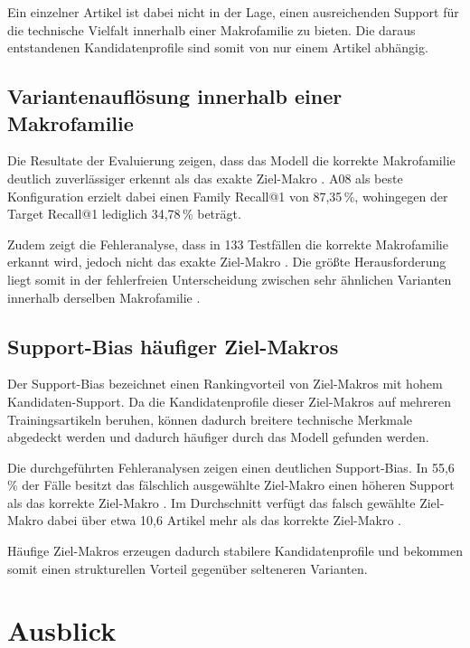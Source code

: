 Ein einzelner Artikel ist dabei nicht in der Lage, einen ausreichenden Support für die technische Vielfalt innerhalb einer Makrofamilie zu bieten.
Die daraus entstandenen Kandidatenprofile sind somit von nur einem Artikel abhängig.

\subsection{Variantenauflösung innerhalb einer Makrofamilie}

Die Resultate der Evaluierung zeigen, dass das Modell die korrekte Makrofamilie deutlich zuverlässiger erkennt als das exakte Ziel-Makro \parencite{EPLAN-Makros}.
A08 als beste Konfiguration erzielt dabei einen Family Recall@1 von 87,35\,\%, wohingegen der Target Recall@1 lediglich 34,78\,\% beträgt.

Zudem zeigt die Fehleranalyse, dass in 133 Testfällen die korrekte Makrofamilie erkannt wird, jedoch nicht das exakte Ziel-Makro \parencite{EPLAN-Makros}.
Die größte Herausforderung liegt somit in der fehlerfreien Unterscheidung zwischen sehr ähnlichen Varianten innerhalb derselben Makrofamilie \parencite{LTR_Configuration_Test_Series}.

\subsection{Support-Bias häufiger Ziel-Makros}

Der Support-Bias bezeichnet einen Rankingvorteil von Ziel-Makros mit hohem Kandidaten-Support. Da die Kandidatenprofile dieser Ziel-Makros auf mehreren Trainingsartikeln beruhen, können dadurch breitere technische Merkmale abgedeckt werden und dadurch häufiger durch das Modell gefunden werden.

Die durchgeführten Fehleranalysen zeigen einen deutlichen Support-Bias. In 55,6\,\% der Fälle besitzt das fälschlich ausgewählte Ziel-Makro \parencite{EPLAN-Makros} einen höheren Support als das korrekte Ziel-Makro \parencite{EPLAN-Makros}.
Im Durchschnitt verfügt das falsch gewählte Ziel-Makro dabei über etwa 10,6 Artikel mehr als das korrekte Ziel-Makro \parencite{LTR_Configuration_Test_Series}.

Häufige Ziel-Makros \parencite{EPLAN-Makros} erzeugen dadurch stabilere Kandidatenprofile und bekommen somit einen strukturellen Vorteil gegenüber selteneren Varianten.

\section{Ausblick}

